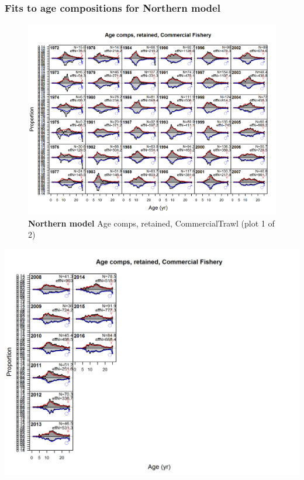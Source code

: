 \documentclass[12pt,]{article}
\begin{document}
\FloatBarrier

\subsubsection{Fits to age compositions for Northern
model}\label{fits-to-age-compositions-for-northern-model}

\begin{figure}[htbp]
\centering
\includegraphics{./r4ss/plots_mod1/comp_agefit_flt1mkt2_page1.png}
\caption{\textbf{Northern model} Age comps, retained, CommercialTrawl
(plot 1 of 2) \label{fig:mod1_1_comp_agefit_flt1mkt2_page1}}
\end{figure}

\includegraphics{./r4ss/plots_mod1/comp_agefit_flt1mkt2_page2.png}
\end{document}
